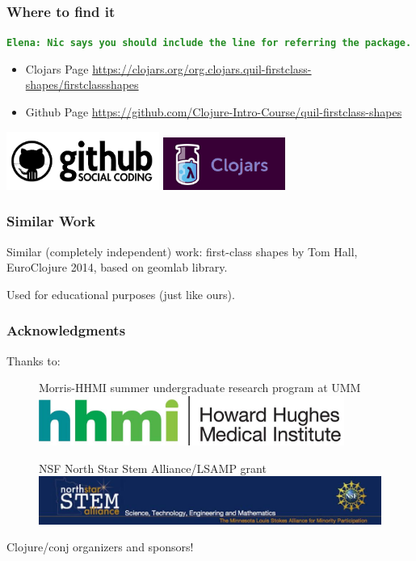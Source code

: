 \documentclass{beamer}
\newcommand{\comment}[1]{{\bf \tt  {#1}}}
\newcommand{\emcomment}[1]{\textcolor{ForestGreen}{\comment{Elena: {#1}}}}
\begin{document}
\begin{frame}
	\frametitle{Where to find it}
	\emcomment{Nic says you should include the line for referring the package.}
	\begin{itemize}
	\item Clojars Page
	\href{https://clojars.org/org.clojars.quil-firstclass-shapes/firstclassshapes}{https://clojars.org/org.clojars.quil-firstclass-shapes/firstclassshapes}
	\item Github Page
	\href{https://github.com/Clojure-Intro-Course/quil-firstclass-shapes}{https://github.com/Clojure-Intro-Course/quil-firstclass-shapes}
	\end{itemize}
	\includegraphics[width=5cm]{PresentationImages/github.png}
	\hspace{1cm}
	\includegraphics[width=4cm]{PresentationImages/clojars.png}
\end{frame}

\begin{frame}
	\frametitle{Similar Work}
Similar (completely independent) work: first-class shapes by Tom Hall, EuroClojure 2014, based on geomlab library. 

Used for educational purposes (just like ours).
\end{frame} 

\begin{frame}
\frametitle{Acknowledgments}
	{\large Thanks to:}
	\begin{figure}
		Morris-HHMI summer undergraduate research program at UMM \includegraphics[width=10cm]{PresentationImages/logoHHMI.jpg}
	\end{figure}
	\begin{figure}
		NSF North Star Stem Alliance/LSAMP grant 
		\includegraphics[width=12cm]{PresentationImages/logoStem.jpg}
	\end{figure}	
	{\centering \qquad Clojure/conj organizers and sponsors!}
\end{frame}
\end{document}
